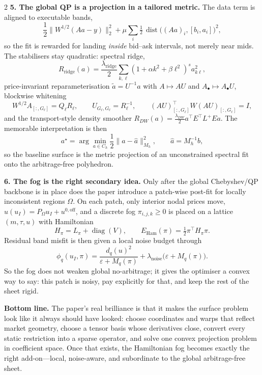 \documentclass[10pt]{article}
\begin{document}
\begin{multicols}{2}
\textbf{\color{ink}5. The global QP is a projection in a tailored metric.} The data term is aligned to executable bands,
\[
\frac12\|W^{1/2}(Aa-y)\|_2^2+\mu\sum_i \tfrac12\,\operatorname{dist}\bigl((Aa)_i,[b_i,a_i]\bigr)^2,
\]
so the fit is rewarded for landing \emph{inside} bid--ask intervals, not merely near mids. The stabilisers stay quadratic: spectral ridge,
\[
R_{\mathrm{ridge}}(a)=\frac{\lambda_{\mathrm{ridge}}}{2}\sum_{k,\ell}(1+\alpha k^2+\beta \ell^2)^s a_{k\ell}^2,
\]
price-invariant reparameterisation $\tilde a=U^{-1}a$ with $A\mapsto AU$ and $A_\bullet\mapsto A_\bullet U$, blockwise whitening
\[
W^{1/2}A_{[:,G_\ell]}=Q_\ell R_\ell,\qquad U_{G_\ell,G_\ell}=R_\ell^{-1},\qquad (AU)_{[:,G_\ell]}^\top W(AU)_{[:,G_\ell]}=I,
\]
and the transport-style density smoother $R_{DW}(a)=\frac{\lambda_{DW}}{2}a^\top E^\top L^+Ea$. The memorable interpretation is then
\[
a^\star=\arg\min_{a\in C_h}\frac12\|a-\hat a\|_{M_h}^2,\qquad \hat a=M_h^{-1}b,
\]
so the baseline surface is the metric projection of an unconstrained spectral fit onto the arbitrage-free polyhedron.

\begin{fogbox}
\textbf{\color{ink}6. The fog is the right secondary idea.} Only after the global Chebyshev/QP backbone is in place does the paper introduce a patch-wise post-fit for locally inconsistent regions $\Omega$. On each patch, only interior nodal prices move, $u(u_I)=P_\Omega u_I+u^{0,\mathrm{off}}$, and a discrete fog $\pi_{i,j,k}\ge 0$ is placed on a lattice $(m,\tau,u)$ with Hamiltonian
\[
H_\pi=L_\pi+\operatorname{diag}(V),\qquad E_{\mathrm{Ham}}(\pi)=\tfrac12\pi^\top H_\pi\pi.
\]
Residual band misfit is then given a local noise budget through
\[
\phi_q(u_I,\pi)=\frac{d_q(u)^2}{\varepsilon+M_q(\pi)}+\lambda_{\mathrm{noise}}\bigl(\varepsilon+M_q(\pi)\bigr).
\]
So the fog does not weaken global no-arbitrage; it gives the optimiser a convex way to say: this patch is noisy, pay explicitly for that, and keep the rest of the sheet rigid.
\end{fogbox}

\begin{takebox}
\textbf{Bottom line.} The paper's real brilliance is that it makes the surface problem look like it always should have looked: choose coordinates and warps that reflect market geometry, choose a tensor basis whose derivatives close, convert every static restriction into a sparse operator, and solve one convex projection problem in coefficient space. Once that exists, the Hamiltonian fog becomes exactly the right add-on---local, noise-aware, and subordinate to the global arbitrage-free sheet.
\end{takebox}

\end{multicols}
\end{document}

